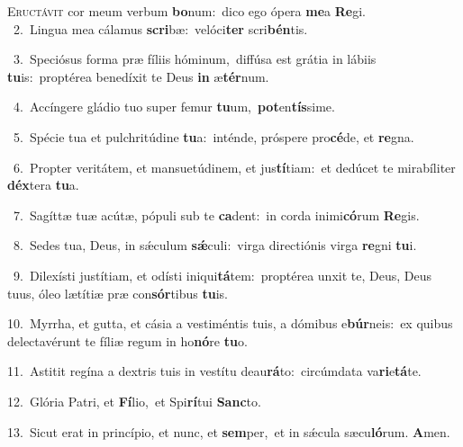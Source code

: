 \lettrine{\initial\textcolor{\initialcolor}{E}}{ructávit} cor meum verbum \textbf{bo}\-num:~\star dico ego ópera \textbf{me}\-a \textbf{Re}\-gi.\\
{\numbfont\textcolor{\numbcolor}{~2.}}~Lingua mea cálamus \textbf{scri}\-bæ:~\star velóci\textbf{ter} scri\-\textbf{bén}\-tis.\par
{\numbfont\textcolor{\numbcolor}{~3.}}~Speciósus forma præ fíliis hóminum,~\dagger diffúsa est grátia in lábiis \textbf{tu}\-is:~\star proptérea benedíxit te Deus \textbf{in} æ\-\textbf{tér}\-num.\par
{\numbfont\textcolor{\numbcolor}{~4.}}~Accíngere gládio tuo super femur \textbf{tu}\-um,~\star \textbf{pot}\-en\-\textbf{tís}\-sime.\par
{\numbfont\textcolor{\numbcolor}{~5.}}~Spécie tua et pulchritúdine \textbf{tu}\-a:~\star inténde, próspere pro\-\textbf{cé}\-de, et \textbf{re}\-gna.\par
{\numbfont\textcolor{\numbcolor}{~6.}}~Propter veritátem, et mansuetúdinem, et jus\-\textbf{tí}\-tiam:~\star et dedúcet te mirabíliter \textbf{déx}\-tera \textbf{tu}\-a.\par
{\numbfont\textcolor{\numbcolor}{~7.}}~Sagíttæ tuæ acútæ, pópuli sub te \textbf{ca}\-dent:~\star in corda inimi\-\textbf{có}\-rum \textbf{Re}\-gis.\par
{\numbfont\textcolor{\numbcolor}{~8.}}~Sedes tua, Deus, in sǽculum \textbf{sǽ}\-culi:~\star virga directiónis virga \textbf{re}\-gni \textbf{tu}\-i.\par
{\numbfont\textcolor{\numbcolor}{~9.}}~Dilexísti justítiam, et odísti iniqui\-\textbf{tá}\-tem:~\star proptérea unxit te, Deus, Deus tuus, óleo lætítiæ præ con\-\textbf{sór}\-tibus \textbf{tu}\-is.\par
{\numbfont\textcolor{\numbcolor}{10.}}~Myrrha, et gutta, et cásia a vestiméntis tuis, a dómibus e\-\textbf{búr}\-neis:~\star ex quibus delectavérunt te fíliæ regum in ho\-\textbf{nó}\-re \textbf{tu}\-o.\par
{\numbfont\textcolor{\numbcolor}{11.}}~Astitit regína a dextris tuis in vestítu deau\-\textbf{rá}\-to:~\star circúmdata va\-\textbf{ri}\-e\-\textbf{tá}\-te.\par
{\numbfont\textcolor{\numbcolor}{12.}}~Glória Patri, et \textbf{Fí}\-lio,~\star et Spi\-\textbf{rí}\-tui \textbf{Sanc}\-to.\par
{\numbfont\textcolor{\numbcolor}{13.}}~Sicut erat in princípio, et nunc, et \textbf{sem}\-per,~\star et in sǽcula sæcu\-\textbf{ló}\-rum. \textbf{A}\-men.\par
